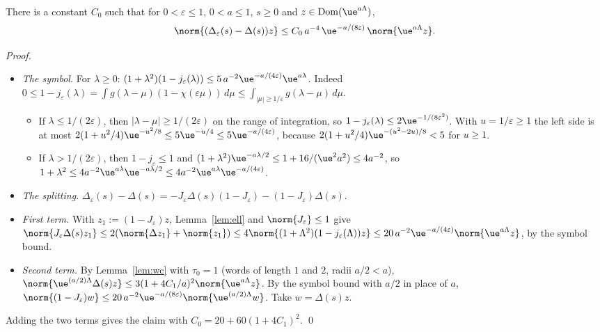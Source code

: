 \begin{lemma}[UD]\label{lem:unw}
There is a constant $C_0$ such that for $0<\varepsilon\le1$, $0<a\le1$, $s\ge0$ and $z\in\operatorname{Dom}(\ue^{a\Lambda})$,
\[
\norm{(\Delta_\varepsilon(s)-\Delta(s))z}\le C_0\,a^{-4}\,\ue^{-a/(8\varepsilon)}\,\norm{\ue^{a\Lambda}z}.
\]
\end{lemma}

\begin{proof}
\begin{itemize}
\item \emph{The symbol.} For $\lambda\ge0$: $(1+\lambda^2)(1-j_\varepsilon(\lambda))\le5\,a^{-2}\ue^{-a/(4\varepsilon)}\ue^{a\lambda}$. Indeed
$0\le1-j_\varepsilon(\lambda)=\int g(\lambda-\mu)(1-\chi(\varepsilon\mu))\,d\mu\le\int_{|\mu|\ge1/\varepsilon}g(\lambda-\mu)\,d\mu$.
  \begin{itemize}
  \item If $\lambda\le1/(2\varepsilon)$, then $|\lambda-\mu|\ge1/(2\varepsilon)$ on the range of integration, so
  $1-j_\varepsilon(\lambda)\le2\ue^{-1/(8\varepsilon^2)}$. With $u=1/\varepsilon\ge1$ the left side is at most
  $2(1+u^2/4)\ue^{-u^2/8}\le5\ue^{-u/4}\le5\ue^{-a/(4\varepsilon)}$, because $2(1+u^2/4)\ue^{-(u^2-2u)/8}<5$ for $u\ge1$.
  \item If $\lambda>1/(2\varepsilon)$, then $1-j_\varepsilon\le1$ and $(1+\lambda^2)\ue^{-a\lambda/2}\le1+16/(\ue^2a^2)\le4a^{-2}$, so
  $1+\lambda^2\le4a^{-2}\ue^{a\lambda}\ue^{-a\lambda/2}\le4a^{-2}\ue^{a\lambda}\ue^{-a/(4\varepsilon)}$.
  \end{itemize}
\item \emph{The splitting.} $\Delta_\varepsilon(s)-\Delta(s)=-J_\varepsilon\Delta(s)(1-J_\varepsilon)-(1-J_\varepsilon)\Delta(s)$.
\item \emph{First term.} With $z_1:=(1-J_\varepsilon)z$, Lemma~\ref{lem:ell} and $\norm{J_\varepsilon}\le1$ give
$\norm{J_\varepsilon\Delta(s)z_1}\le2(\norm{\Delta z_1}+\norm{z_1})\le4\norm{(1+\Lambda^2)(1-j_\varepsilon(\Lambda))z}\le20\,a^{-2}\ue^{-a/(4\varepsilon)}\norm{\ue^{a\Lambda}z}$,
by the symbol bound.
\item \emph{Second term.} By Lemma~\ref{lem:wc} with $\tau_0=1$ (words of length $1$ and $2$, radii $a/2<a$),
$\norm{\ue^{(a/2)\Lambda}\Delta(s)z}\le3(1+4C_1/a)^2\norm{\ue^{a\Lambda}z}$. By the symbol bound with $a/2$ in place of $a$,
$\norm{(1-J_\varepsilon)w}\le20\,a^{-2}\ue^{-a/(8\varepsilon)}\norm{\ue^{(a/2)\Lambda}w}$. Take $w=\Delta(s)z$.
\end{itemize}
Adding the two terms gives the claim with $C_0=20+60(1+4C_1)^2$. \qed
\end{proof}

